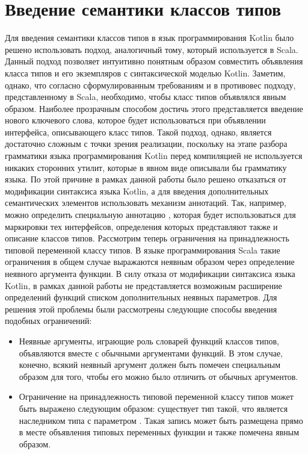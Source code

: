 \section{Введение семантики классов типов \label{sct:problem-semantic}}

Для введения семантики классов типов в язык программирования Kotlin было решено использовать подход, аналогичный тому, который используется в Scala. Данный подход позволяет интуитивно понятным образом совместить объявления класса типов и его экземпляров с синтаксической моделью Kotlin. Заметим, однако, что согласно сформулированным требованиям и в противовес подходу, представленному в Scala, необходимо, чтобы класс типов объявлялся явным образом. Наиболее прозрачным способом достичь этого представляется введение нового ключевого слова, которое будет использоваться при объявлении интерфейса, описывающего класс типов. Такой подход, однако, является достаточно сложным с точки зрения реализации, поскольку на этапе разбора грамматики языка программирования Kotlin перед компиляцией не используется никаких сторонних утилит, которые в явном виде описывали бы грамматику языка. По этой причине в рамках данной работы было решено отказаться от модификации синтаксиса языка Kotlin, а для введения дополнительных семантических элементов использовать механизм аннотаций. Так, например, можно определить специальную аннотацию , которая будет использоваться для маркировки тех интерфейсов, определения которых представляют также и описание классов типов. Рассмотрим теперь ограничения на принадлежность типовой переменной классу типов. В языке программирования Scala такие ограничения в общем случае выражаются неявным образом через определение неявного аргумента функции. В силу отказа от модификации синтаксиса языка Kotlin, в рамках данной работы не представляется возможным расширение определений функций списком дополнительных неявных параметров. %
Для решения этой проблемы были рассмотрены следующие способы введения подобных ограничений:
\begin{itemize}
    \item Неявные аргументы, играющие роль словарей функций классов типов, объявляются вместе с обычными аргументами функций. В этом случае, конечно, всякий неявный аргумент должен быть помечен специальным образом для того, чтобы его можно было отличить от обычных аргументов. %
    \item Ограничение на принадлежность типовой переменной  классу типов  может быть выражено следующим образом: существует тип  такой, что  является наследником типа  с параметром . Такая запись может быть размещена прямо в месте объявления типовых переменных функции и также помечена явным образом.
\end{itemize}
